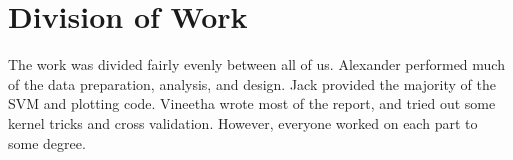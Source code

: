 \documentclass[journal]{IEEEtran}
\begin{document}
%
%


%




\section{Division of Work}
The work was divided fairly evenly between all of us. Alexander performed much of the data preparation, analysis, and design.
Jack provided the majority of the SVM and plotting code. Vineetha wrote most of the report, and tried out some kernel tricks and cross validation. However, everyone worked on each part to some degree.
\end{document}

